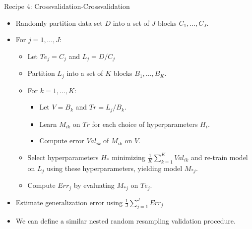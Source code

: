 \documentclass[serif,xcolor=pdftex,dvipsnames,table,hyperref={bookmarks=false}]{beamer}
\begin{document}
\begin{frame}[t]{Recipe 4: Crossvalidation-Crossvalidation}
\begin{itemize}
\setlength{\itemsep}{6pt}

\item Randomly partition data set $D$ into a set of $J$ blocks $C_1,...,C_J$.

\pause \item For $j=1,...,J$:
\begin{itemize}
  \pause\item Let $Te_j = C_j$ and $L_j = D/C_j$ 
  \pause\item Partition $L_j$ into a set of $K$ blocks $B_{1},...,B_{K}$.
  \pause \item For $k=1,...,K$:
  \begin{itemize}
    \pause\item Let $V=B_{k}$ and $Tr= L_j/B_k$.
    \pause\item Learn $M_{ik}$ on $Tr$ for each choice of hyperparameters $H_i$.
    \pause\item Compute error $Val_{ik}$ of $M_{ik}$ on $V$.
  \end{itemize}
  \pause\item Select hyperparameters $H_*$ minimizing $\frac{1}{K}\sum_{k=1}^K Val_{ik}$ and re-train model on $L_j$ using these hyperparameters, yielding model $M_{*j}$.
  \pause\item Compute $Err_j$ by evaluating $M_{*j}$ on $Te_j$.
\end{itemize}
\pause \item Estimate generalization error using $\frac{1}{J}\sum_{j=1}^JErr_j$

\pause \item We can define a similar nested random resampling validation procedure.

\end{itemize}

\end{frame}
\end{document}
